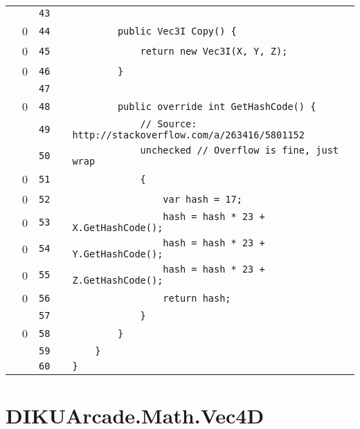 \documentclass[a4paper,landscape,10pt]{article}
\begin{document}
\begin{longtable}[l]{lrrll}
\cellcolor{gray} &  & \verb~43~ & & \verb~~\\
\cellcolor{red} & 0 & \verb~44~ & & \verb~        public Vec3I Copy() {~\\
\cellcolor{red} & 0 & \verb~45~ & & \verb~            return new Vec3I(X, Y, Z);~\\
\cellcolor{red} & 0 & \verb~46~ & & \verb~        }~\\
\cellcolor{gray} &  & \verb~47~ & & \verb~~\\
\cellcolor{red} & 0 & \verb~48~ & & \verb~        public override int GetHashCode() {~\\
\cellcolor{gray} &  & \verb~49~ & & \verb~            // Source: http://stackoverflow.com/a/263416/5801152~\\
\cellcolor{gray} &  & \verb~50~ & & \verb~            unchecked // Overflow is fine, just wrap~\\
\cellcolor{red} & 0 & \verb~51~ & & \verb~            {~\\
\cellcolor{red} & 0 & \verb~52~ & & \verb~                var hash = 17;~\\
\cellcolor{red} & 0 & \verb~53~ & & \verb~                hash = hash * 23 + X.GetHashCode();~\\
\cellcolor{red} & 0 & \verb~54~ & & \verb~                hash = hash * 23 + Y.GetHashCode();~\\
\cellcolor{red} & 0 & \verb~55~ & & \verb~                hash = hash * 23 + Z.GetHashCode();~\\
\cellcolor{red} & 0 & \verb~56~ & & \verb~                return hash;~\\
\cellcolor{gray} &  & \verb~57~ & & \verb~            }~\\
\cellcolor{red} & 0 & \verb~58~ & & \verb~        }~\\
\cellcolor{gray} &  & \verb~59~ & & \verb~    }~\\
\cellcolor{gray} &  & \verb~60~ & & \verb~}~\\
\end{longtable}
\newpage
\section{DIKUArcade.Math.Vec4D}
\end{document}
